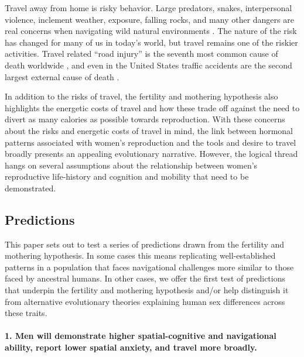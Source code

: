 
Travel away from home is risky behavior.  Large predators, snakes, interpersonal violence, inclement weather, exposure, falling rocks, and many other dangers are real concerns when navigating wild natural environments \citep{treves1999risk, pugh1980incidence, walker2001bioarchaeological}.  The nature of the risk has changed for many of us in today's world, but travel remains one of the riskier activities.  Travel related ``road injury'' is the seventh most common cause of death worldwide \citep{krug2000global}, and even in the United States traffic accidents are the second largest external cause of death \citep{sherry2010cdc}.  

In addition to the risks of travel, the fertility and mothering hypothesis also highlights the energetic costs of travel and how these trade off against the need to divert as many calories as possible towards reproduction.  With these concerns about the risks and energetic costs of travel in mind, the link between hormonal patterns associated with women's reproduction and the tools and desire to travel broadly presents an appealing evolutionary narrative.  However, the logical thread hangs on several assumptions about the relationship between women's reproductive life-history and cognition and mobility that need to be demonstrated.

	\subsection{Predictions}
	\label{sec:1.2}
This paper sets out to test a series of predictions drawn from the fertility and mothering hypothesis.  In some cases this means replicating well-established patterns in a population that faces navigational challenges more similar to those faced by ancestral humans.  In other cases, we offer the first test of predictions that underpin the fertility and mothering hypothesis and/or help distinguish it from alternative evolutionary theories explaining human sex differences across these traits.	
	
\paragraph{1. Men will demonstrate higher spatial-cognitive and navigational ability, report lower spatial anxiety, and travel more broadly.}\mbox{}\\


